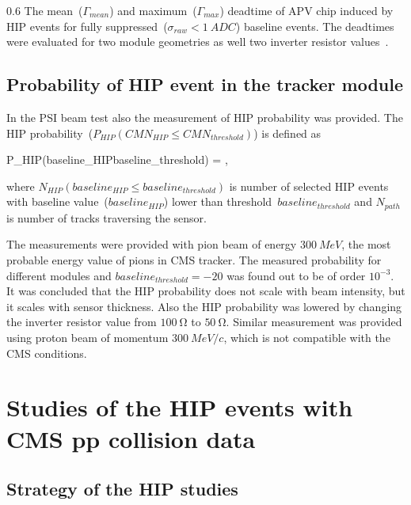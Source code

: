                  {0.6}       %
                 {The mean~($\Gamma_{mean}$) and maximum~($\Gamma_{max}$) deadtime of APV chip induced by HIP events for fully suppressed~($\sigma_{raw}<1~ADC$) baseline events. The deadtimes were evaluated for two module geometries as well two inverter resistor values~\cite{Bainbridge:2004jc}.} %


\subsection{Probability of HIP event in the tracker module}

In the PSI beam test also the measurement of HIP probability was provided. The HIP probability~($P_{HIP}(CMN_{HIP}\leq CMN_{threshold})$) is defined as 

{
P_{HIP}(baseline_{HIP}\leq baseline_{threshold}) = ,
}

where $N_{HIP}(baseline_{HIP}\leq baseline_{threshold})$ is number of selected HIP events with baseline value~($baseline_{HIP}$) lower than threshold~$baseline_{threshold}$ and $N_{path}$ is number of tracks traversing the sensor.

The measurements were provided with pion beam of energy $300~MeV$, the most probable energy value of pions in CMS tracker. The measured probability for different modules and $baseline_{threshold}=-20$ was found out to be of order $10^{-3}$. It was concluded that the HIP probability does not scale with beam intensity, but it scales with sensor thickness. Also the HIP probability was lowered by changing the inverter resistor value from $100~\mathrm{\Omega}$ to  $50~\mathrm{\Omega}$. Similar measurement was provided using proton beam of momentum $300~MeV/c$, which is not compatible with the CMS conditions.


\section{Studies of the HIP events with CMS pp collision data}

\subsection{Strategy of the HIP studies}

